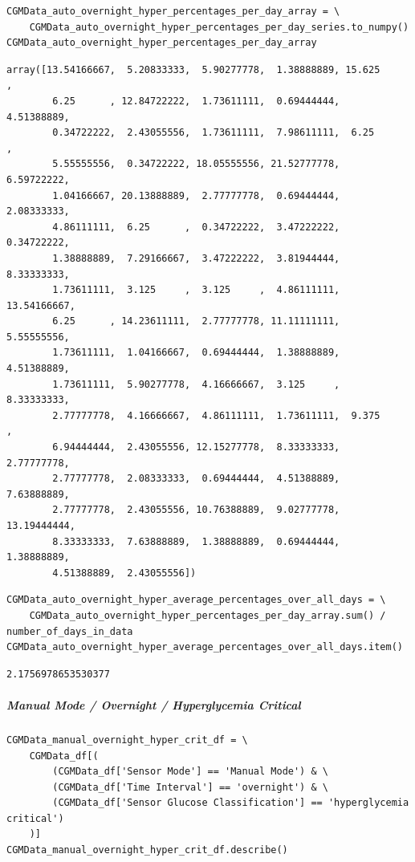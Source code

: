 \begin{verbatim}
CGMData_auto_overnight_hyper_percentages_per_day_array = \
    CGMData_auto_overnight_hyper_percentages_per_day_series.to_numpy()
CGMData_auto_overnight_hyper_percentages_per_day_array
\end{verbatim}

\begin{verbatim}
array([13.54166667,  5.20833333,  5.90277778,  1.38888889, 15.625     ,
        6.25      , 12.84722222,  1.73611111,  0.69444444,  4.51388889,
        0.34722222,  2.43055556,  1.73611111,  7.98611111,  6.25      ,
        5.55555556,  0.34722222, 18.05555556, 21.52777778,  6.59722222,
        1.04166667, 20.13888889,  2.77777778,  0.69444444,  2.08333333,
        4.86111111,  6.25      ,  0.34722222,  3.47222222,  0.34722222,
        1.38888889,  7.29166667,  3.47222222,  3.81944444,  8.33333333,
        1.73611111,  3.125     ,  3.125     ,  4.86111111, 13.54166667,
        6.25      , 14.23611111,  2.77777778, 11.11111111,  5.55555556,
        1.73611111,  1.04166667,  0.69444444,  1.38888889,  4.51388889,
        1.73611111,  5.90277778,  4.16666667,  3.125     ,  8.33333333,
        2.77777778,  4.16666667,  4.86111111,  1.73611111,  9.375     ,
        6.94444444,  2.43055556, 12.15277778,  8.33333333,  2.77777778,
        2.77777778,  2.08333333,  0.69444444,  4.51388889,  7.63888889,
        2.77777778,  2.43055556, 10.76388889,  9.02777778, 13.19444444,
        8.33333333,  7.63888889,  1.38888889,  0.69444444,  1.38888889,
        4.51388889,  2.43055556])
\end{verbatim}

\begin{verbatim}
CGMData_auto_overnight_hyper_average_percentages_over_all_days = \
    CGMData_auto_overnight_hyper_percentages_per_day_array.sum() / number_of_days_in_data
CGMData_auto_overnight_hyper_average_percentages_over_all_days.item()
\end{verbatim}

\begin{verbatim}
2.1756978653530377
\end{verbatim}

\subparagraph{Manual Mode / Overnight / Hyperglycemia Critical}

\begin{verbatim}
CGMData_manual_overnight_hyper_crit_df = \
    CGMData_df[(
        (CGMData_df['Sensor Mode'] == 'Manual Mode') & \
        (CGMData_df['Time Interval'] == 'overnight') & \
        (CGMData_df['Sensor Glucose Classification'] == 'hyperglycemia critical')
    )]
CGMData_manual_overnight_hyper_crit_df.describe()
\end{verbatim}

